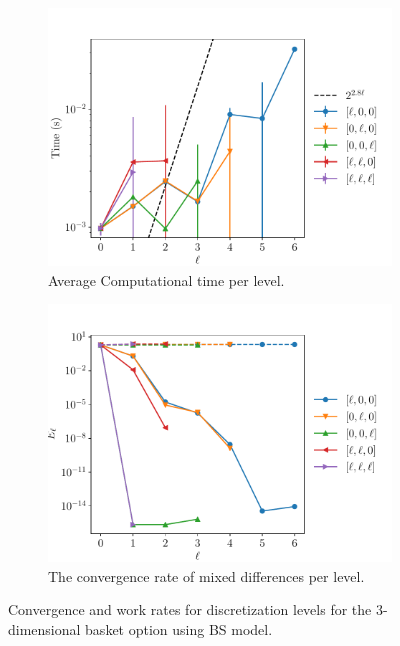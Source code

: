 \documentclass[11pt]{article}
\begin{document}
\begin{figure}[!h]
	\centering
	\begin{subfigure}{.5\textwidth}
		\centering
		\includegraphics[width=0.95\linewidth]{./figures/3D_basket/level_work.pdf}
		\caption{Average Computational time per level.}
		\label{fig:misc_3D_Basket_sub3}
	\end{subfigure}%
	\begin{subfigure}{.5\textwidth}
		\centering
		\includegraphics[width=0.95\linewidth]{./figures/3D_basket/levels_error_rate.pdf}
		\caption{The convergence rate of mixed differences per level.}
		\label{fig:misc_3D_Basket_sub4}
	\end{subfigure}%
	\caption{Convergence and work rates for discretization levels for the $3$-dimensional basket option using BS model.}
	\label{fig:misc_3D_Basket_2}
\end{figure}
\end{document}

